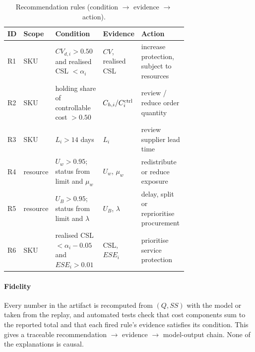 \begin{table}[!t]
\centering\footnotesize
\caption{Recommendation rules (condition $\to$ evidence $\to$ action).}\label{tab:rules}
\begin{tabular}{@{}ll>{\raggedright\arraybackslash}p{0.3\linewidth}>{\raggedright\arraybackslash}p{0.15\linewidth}>{\raggedright\arraybackslash}p{0.27\linewidth}@{}}
\toprule
ID & Scope & Condition & Evidence & Action \\
\midrule
R1 & SKU & $CV_{d,i}>0.50$ and realised CSL $<\alpha_i$ & $CV$, realised CSL & increase protection, subject to resources \\
R2 & SKU & holding share of controllable cost $>0.50$ & $C_{h,i}/C^{\mathrm{ctrl}}_i$ & review / reduce order quantity \\
R3 & SKU & $L_i>14$ days & $L_i$ & review supplier lead time \\
R4 & resource & $U_w>0.95$; status from limit and $\mu_w$ & $U_w$, $\mu_w$ & redistribute or reduce exposure \\
R5 & resource & $U_B>0.95$; status from limit and $\lambda$ & $U_B$, $\lambda$ & delay, split or reprioritise procurement \\
R6 & SKU & realised CSL $<\alpha_i-0.05$ and $ESE_i>0.01$ & CSL, $ESE_i$ & prioritise service protection \\
\bottomrule
\end{tabular}
\end{table}



\paragraph{Fidelity} Every number in the artifact is recomputed from $(Q,SS)$ with the model or taken from the replay, and automated tests check that cost components sum to the reported total and that each fired rule's evidence satisfies its condition. This gives a traceable recommendation $\to$ evidence $\to$ model-output chain. None of the explanations is causal.


